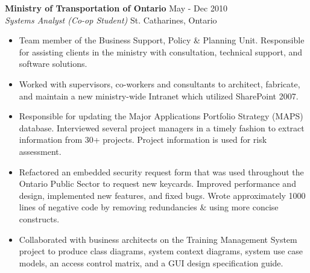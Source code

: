 \documentclass[margin]{res}
\begin{document}
\begin{resume}
	\textbf{Ministry of Transportation of Ontario} \hfill May - Dec 2010 \\
    {\sl Systems Analyst (Co-op Student)} \hfill St. Catharines, Ontario %
	\begin{itemize}  \itemsep -2pt %
	  \item Team member of the Business Support, Policy \& Planning Unit.
	  Responsible for assisting clients in the ministry with consultation, technical support,
	  and software solutions.
	  \item Worked with supervisors, co-workers and consultants to architect, fabricate,
	  and maintain a new ministry-wide Intranet which utilized SharePoint 2007.
	  \item Responsible for updating the Major Applications Portfolio Strategy (MAPS) database.
	  Interviewed several project managers in a timely fashion to extract information from 30+
	  projects. Project information is used for risk assessment.
	  \item Refactored an embedded security request form that was used throughout the
	  Ontario Public Sector to request new keycards. Improved performance and design,
	  implemented new features, and fixed bugs. Wrote approximately 1000 lines of negative code
	  by removing redundancies \& using more concise constructs.
	  \item Collaborated with business architects on the Training Management System project
	  to produce class diagrams, system context diagrams, system use case models,
	  an access control matrix, and a GUI design specification guide.
	\end{itemize}

%



\end{resume}
\end{document}
